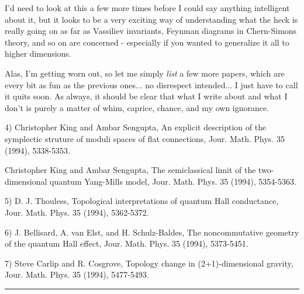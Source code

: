 I'd need to look at this a few more times before I could say
anything intelligent about it, but it looks to be a very exciting
way of understanding what the heck is really going on as far
as Vassiliev invariants, Feynman diagrams in Chern-Simons theory,
and so on are concerned - especially if you wanted to generalize
it all to higher dimensions.

Alas, I'm getting worn out, so let me simply \emph{list} a few more
papers, which are every bit as fun as the previous ones... no
disrespect intended... I just have to call it quits soon.  As
always, it should be clear that what I write about and what I 
don't is purely a matter of whim, caprice, chance, and my own
ignorance.  

4) Christopher King and Ambar Sengupta, 
An explicit description of the symplectic struture of moduli
spaces of flat connections, Jour.  Math. Phys. 35 (1994), 5338-5353.

Christopher King and Ambar Sengupta, 
The semiclassical limit of the two-dimensional quantum Yang-Mills
model, Jour. Math. Phys. 35 (1994), 5354-5363.

5) D. J. Thouless, 
Topological interpretations of quantum Hall conductance, 
Jour. Math. Phys. 35 (1994), 5362-5372.

6) J. Bellisard, A. van Elst, and H. Schulz-Baldes, 
The noncommutative geometry of the quantum Hall effect, 
Jour. Math. Phys. 35 (1994),
5373-5451.

7) Steve Carlip and R. Cosgrove, 
Topology change in (2+1)-dimensional gravity, 
Jour. Math. Phys. 35 (1994), 5477-5493.

\par\noindent\rule{\textwidth}{0.4pt}



